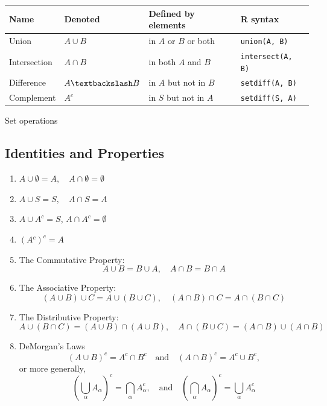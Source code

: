 \documentclass[captions=tableheading]{scrbook}
\begin{document}
\begin{center}
\begin{tabular}{llll}
 Name          &  Denoted                &  Defined by elements        &  \textsf{R} syntax         \\
\hline
 Union         &  \(A\cup B\)            &  in \(A\) or \(B\) or both  &  \texttt{union(A, B)}      \\
 Intersection  &  \(A\cap B\)            &  in both \(A\) and \(B\)    &  \texttt{intersect(A, B)}  \\
 Difference    &  \(A\textbackslash B\)  &  in \(A\) but not in \(B\)  &  \texttt{setdiff(A, B)}    \\
 Complement    &  \(A^{c}\)              &  in \(S\) but not in \(A\)  &  \texttt{setdiff(S, A)}    \\
\end{tabular}
\end{center}


\caption{Set operations\label{tab:Set-Operations}}
\subsection{Identities and Properties}
\label{sec-21-1-2}


\begin{enumerate}
\item \(A\cup\emptyset=A,\quad A\cap\emptyset=\emptyset\)
\item \(A\cup S=S,\quad A\cap S=A\)
\item \(A\cup A^{c}=S\), \(A\cap A^{c}=\emptyset\)
\item \((A{}^{c})^{c}=A\)
\item The Commutative Property: 
   \begin{equation}
   A \cup B = B\cup A,\quad A\cap B = B\cap A
   \end{equation}
\item The Associative Property: 
   \begin{equation}
   (A\cup B)\cup C=A\cup(B\cup C),\quad(A\cap B)\cap C=A\cap(B\cap C)
   \end{equation}
\item The Distributive Property: 
   \begin{equation}
   A\cup(B\cap C)=(A\cup B)\cap(A\cup B),\quad A\cap(B\cup C)=(A\cap B)\cup(A\cap B)
   \end{equation}
\item DeMorgan's Laws
   \begin{equation}
   (A\cup B)^{c}=A^{c}\cap B^{c}\quad\mbox{and}\quad(A\cap B)^{c}=A^{c}\cup B^{c},
   \end{equation}
   or more generally,
   \begin{equation}
   \left(\bigcup_{\alpha}A_{\alpha}\right)^{c}=\bigcap_{\alpha}A_{\alpha}^{c},\quad\mbox{and}\quad\left(\bigcap_{\alpha}A_{\alpha}\right)^{c}=\bigcup_{\alpha}A_{\alpha}^{c}
   \end{equation}
\end{enumerate}
\end{document}
